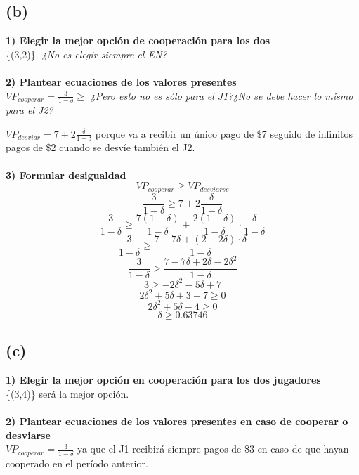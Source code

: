 \documentclass{article}
\begin{document}
        \subsection*{(b)}
            \textbf{1) Elegir la mejor opción de cooperación para los dos}
            \\
            \{(3,2)\}. \textit{¿No es elegir siempre el EN?}
            \\
            \\
            \textbf{2) Plantear ecuaciones de los valores presentes}
            \\
            \(VP_{cooperar} = \frac{3}{1 - \delta} \geq \) \textit{¿Pero esto no es sólo para el J1?¿No se debe hacer lo mismo para el J2?}
            
            \(VP_{desviar} = 7 + 2\frac{\delta}{1 -\delta}\) porque va a recibir un único pago de \$7 seguido de infinitos pagos de \$2 cuando se desvíe también el J2.
            \\
            \\
            \textbf{3) Formular desigualdad}
            \\
            \[VP_{cooperar} \geq VP_{desviarse}\]
            \[\frac{3}{1 - \delta} \geq 7 + 2\frac{\delta}{1 -\delta}\]
            \[\frac{3}{1 - \delta} \geq \frac{7(1 - \delta)}{1 - \delta} + \frac{2(1 - \delta)}{1 - \delta} \cdot \frac{\delta}{1 - \delta}\]
            \[\frac{3}{1 - \delta} \geq \frac{7 - 7 \delta + (2 - 2 \delta) \cdot \delta}{1 - \delta}\]
            \[\frac{3}{1 - \delta} \geq \frac{7 - 7 \delta + 2 \delta - 2 \delta^{2}}{1 - \delta}\]
            \[3 \geq -2 \delta^{2} - 5 \delta + 7\]
            \[2 \delta^{2} + 5 \delta + 3 - 7 \geq 0\]
            \[2 \delta^{2} + 5 \delta - 4 \geq 0\]
            \[\delta \geq 0.63746\]

        \subsection*{(c)}
            \textbf{1) Elegir la mejor opción en cooperación para los dos jugadores}
            \\
            \{(3,4)\} será la mejor opción.
            \\
            \\
            \textbf{2) Plantear ecuaciones de los valores presentes en caso de cooperar o desviarse}
            \\
            \(VP_{cooperar} = \frac{3}{1 - \delta}\) ya que el J1 recibirá siempre pagos de \$3 en caso de que hayan cooperado en el período anterior.
\end{document}
